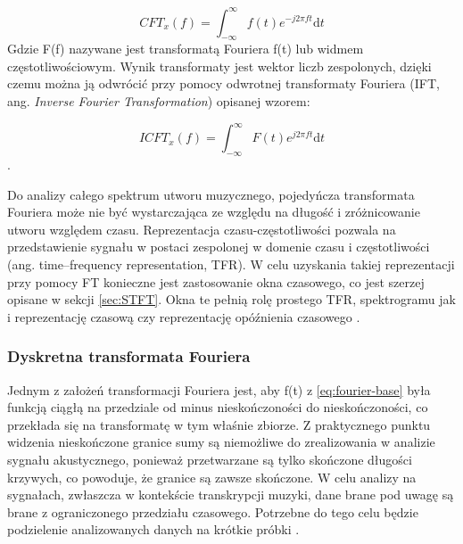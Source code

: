 \documentclass[12pt,a4paper,twoside]{mwart}
\begin{document}
\begin{equation} \label{eq:fourier-base}
CFT_x(f) = \int_{-\infty}^{\infty}\textit{f}(t)e^ {-j2\pi ft}\mathrm{d}t
\end{equation}
Gdzie F(f) nazywane jest transformatą Fouriera f(t) lub widmem częstotliwościowym. Wynik transformaty jest wektor liczb zespolonych, dzięki czemu można ją odwrócić przy pomocy odwrotnej transformaty Fouriera (IFT, ang. \textit{Inverse Fourier Transformation}) opisanej wzorem:

\begin{equation} \label{eq:inverse:fourier-base}
ICFT_x(f) = \int_{-\infty}^{\infty}\textit{F}(t)e^ {j2\pi ft}\mathrm{d}t
\end{equation}
\cite[22]{Transcription:Anssi:SignalProcessingMethods}.

Do analizy całego spektrum utworu muzycznego, pojedyńcza transformata Fouriera może nie być wystarczająca ze względu na długość i zróżnicowanie utworu względem czasu. Reprezentacja czasu-częstotliwości pozwala na przedstawienie sygnału w postaci zespolonej w domenie czasu i częstotliwości (ang. time–frequency representation, TFR). W celu uzyskania takiej reprezentacji przy pomocy FT konieczne jest zastosowanie okna czasowego, co jest szerzej opisane w sekcji \ref{sec:STFT}. Okna te pełnią rolę prostego TFR, spektrogramu jak i reprezentację czasową czy reprezentację opóźnienia czasowego 
\cite[22-23]{CyfrowePrzetwarzanieSygnalowOdTeoriiDoZastosowan}\cite[26-29]{Transcription:Quenneville:Thesis}
\cite[22-25]{Transcription:Anssi:SignalProcessingMethods}.

\subsubsection{Dyskretna transformata Fouriera} \label{sec:DFT}
Jednym z założeń transformacji Fouriera jest, aby f(t) z \ref{eq:fourier-base} była funkcją ciągłą na przedziale od minus nieskończoności do nieskończoności, co przekłada się na transformatę w tym właśnie zbiorze. Z praktycznego punktu widzenia nieskończone granice sumy są niemożliwe do zrealizowania w analizie sygnału akustycznego, ponieważ przetwarzane są tylko skończone długości krzywych, co powoduje, że granice są zawsze skończone. W celu analizy na sygnałach, zwłaszcza w kontekście transkrypcji muzyki, dane brane pod uwagę są brane z ograniczonego przedziału czasowego. Potrzebne do tego celu będzie podzielenie analizowanych danych na krótkie próbki \cite[29-30]{Transcription:Quenneville:Thesis}\cite{TransformacjaFourieraelektronikab2b}.
\end{document}
